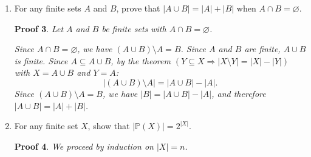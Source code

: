 \documentclass[12pt]{article}
\newcommand{\Pow}{\mathbb{P}}
\theoremstyle{proofstyle}
\newtheorem*{proof*}{Proof}
\begin{document}
\begin{enumerate}[left=0pt, itemsep=2em, parsep=1em]
\begin{enumerate}[label=(\alph*), itemsep=1.5em, leftmargin=2em]
\begin{proof*}
  Since $c$ was arbitrary, $h$ is surjective, so $|A| \geq |C|$. \qed
  \end{proof*}

  \item Prove that $\forall A \forall B \forall C\,((|A| = |B| \land |B| = |C|) \Rightarrow |A| = |C|)$.

  \begin{proof*}
  Let $A$, $B$, $C$ be arbitrary sets, and suppose $|A| = |B|$ and $|B| = |C|$. By Cantor-Schröder-Bernstein theorem, $|A| \leq |B|$, $|B| \leq |A|$, $|B| \leq |C|$, and $|C| \leq |B|$.
 
  By part (a), $|A| \leq |B|$ and $|B| \leq |C|$ gives $|A| \leq |C|$.
 
  By part (a) again, $|C| \leq |B|$ and $|B| \leq |A|$ gives $|C| \leq |A|$.
 
  By Cantor-Schröder-Bernstein theorem, $|A| \leq |C|$ and $|C| \leq |A|$ gives $|A| = |C|$. 
  
  \qed
  \end{proof*}

\end{enumerate}

\newpage

\item For any finite sets $A$ and $B$, prove that $|A \cup B| = |A| + |B|$ when $A \cap B = \varnothing$.

\begin{proof*}
Let $A$ and $B$ be finite sets with $A \cap B = \varnothing$.
 
Since $A \cap B = \varnothing$, we have $(A \cup B) \setminus A = B$. Since $A$ and $B$ are finite, $A \cup B$ is finite. Since $A \subseteq A \cup B$, by the theorem $(Y \subseteq X \Rightarrow |X \setminus Y| = |X| - |Y|)$ with $X = A \cup B$ and $Y = A$:
\[
  |(A \cup B) \setminus A| = |A \cup B| - |A|.
\]
Since $(A \cup B) \setminus A = B$, we have $|B| = |A \cup B| - |A|$, and therefore $|A \cup B| = |A| + |B|$.
\end{proof*}
\newpage

\item For any finite set $X$, show that $|\Pow(X)| = 2^{|X|}$.

\begin{proof*}
We proceed by induction on $|X| = n$.


\end{proof*}
\end{enumerate}
\end{document}
